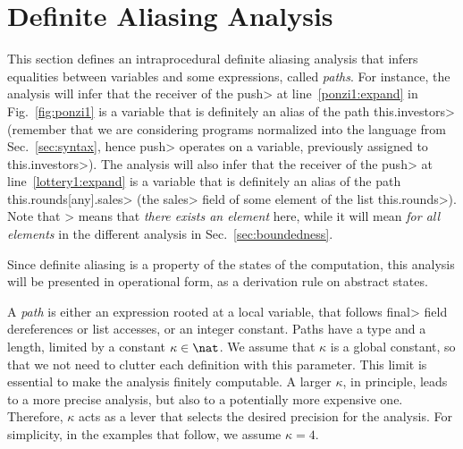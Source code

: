\section{Definite Aliasing Analysis}\label{sec:aliasing}

This section defines an intraprocedural definite aliasing analysis that infers
equalities between variables and some expressions, called \emph{paths}.
For instance, the analysis will infer that the receiver of the \<push>
at line~\ref{ponzi1:expand} in Fig.~\ref{fig:ponzi1}
is a variable that is definitely an alias of the path \<this.investors>
(remember that we are considering programs normalized into the language from
Sec.~\ref{sec:syntax}, hence \<push> operates on a variable, previously assigned
to \<this.investors>).
The analysis will also infer that the receiver of the \<push> at line~\ref{lottery1:expand}
is a variable that is definitely an alias of the path \<this.rounds[any].sales>
(\ieinitial the \<sales> field of some element of the list \<this.rounds>).
Note that \<[any]> means that \emph{there exists an element} here, while it will
mean \emph{for all elements} in the different analysis in Sec.~\ref{sec:boundedness}.

Since definite aliasing is a property of the states of the computation, this analysis
will be presented in operational form, as a derivation rule on abstract states.

A \emph{path} is either an expression rooted at a local variable, that follows
\<final> field dereferences or list accesses, or an integer constant.
Paths have a type and a length, limited by a constant $\kappa\in\nat$.
We assume that $\kappa$ is a global constant,
so that we not need to clutter each definition with this parameter.
This limit is essential to make the analysis finitely computable.
A larger $\kappa$, in principle, leads to a more precise analysis,
but also to a potentially more expensive one.
Therefore, $\kappa$ acts as a lever that selects the desired precision for the
analysis. For simplicity, in the examples that follow, we assume $\kappa=4$.

